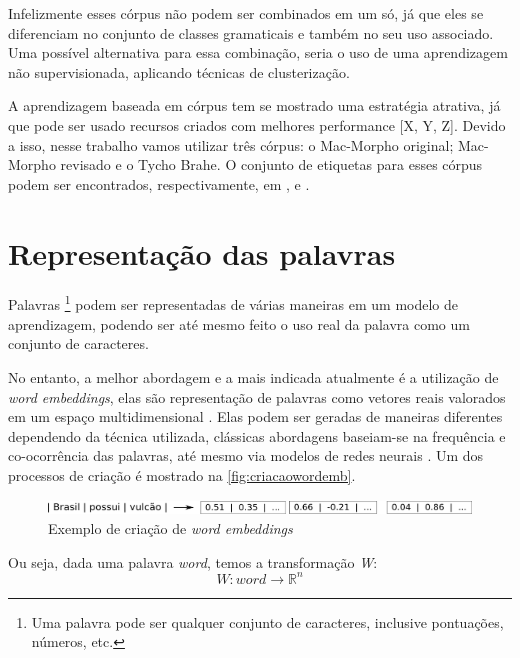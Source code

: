 Infelizmente esses córpus não podem ser combinados em um só, já que eles se diferenciam no conjunto de classes gramaticais e também no seu uso associado. Uma possível alternativa para essa combinação, seria o uso de uma aprendizagem não supervisionada, aplicando técnicas de clusterização.

A aprendizagem baseada em córpus tem se mostrado uma estratégia atrativa, já que pode ser usado recursos criados com melhores performance [X, Y, Z]. Devido a isso, nesse trabalho vamos utilizar três córpus: o Mac-Morpho original; Mac-Morpho revisado e o Tycho Brahe. O conjunto de etiquetas para esses córpus podem ser encontrados, respectivamente, em \cite{aluisio2003account}, \cite{fonseca2015evaluating} e \cite{temponi2004corpus}.



\section{Representação das palavras}\label{sec:representacaodaspalavras}

Palavras \footnote{Uma palavra pode ser qualquer conjunto de caracteres, inclusive pontuações, números, etc.} podem ser representadas de várias maneiras em um modelo de aprendizagem, podendo ser até mesmo feito o uso real da palavra como um conjunto de caracteres.

No entanto, a melhor abordagem e a mais indicada atualmente é a utilização de \textit{word embeddings}, elas são representação de palavras como vetores reais valorados em um espaço multidimensional \cite{turian2010word}. Elas podem ser geradas de maneiras diferentes dependendo da técnica utilizada, clássicas abordagens baseiam-se na frequência e co-ocorrência das palavras, até mesmo via modelos de redes neurais \cite{dos2014training}. Um dos processos de criação é mostrado na \autoref{fig:criacaowordemb}.

\begin{figure}[htb]
  \caption{Exemplo de criação de \textit{word embeddings}} \label{fig:criacaowordemb}
  \begin{center}
      \includegraphics[scale=0.3]{img/criacaowordemb}
  \end{center}
\end{figure}


Ou seja, dada uma palavra \textit{word}, temos a transformação \textit{W}:
\begin{equation}
W:word \to \mathbb{R}^n
\end{equation}

